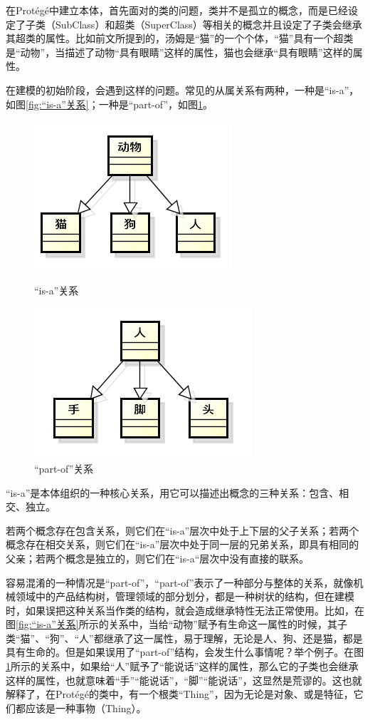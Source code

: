 \documentclass[12pt,a4paper]{article}
\begin{document}
	在Prot{\'e}g{\'e}中建立本体，首先面对的类的问题，类并不是孤立的概念，而是已经设定了子类（SubClass）和超类（SuperClass）等相关的概念并且设定了子类会继承其超类的属性。比如前文所提到的，汤姆是“猫”的一个个体，“猫”具有一个超类是“动物”，当描述了动物“具有眼睛”这样的属性，猫也会继承“具有眼睛”这样的属性。
	
	在建模的初始阶段，会遇到这样的问题。常见的从属关系有两种，一种是“is-a”，如图\ref{fig:“is-a”关系}；一种是“part-of”，如图\ref{fig:“part-of”关系}。
	\begin{figure}[htbp]
	\begin{minipage}[t]{0.5\linewidth}
	\centering
	\includegraphics[scale=1]{fig/isA.png}
	\caption{“is-a”关系}
	\label{fig:“is-a”关系}
	\end{minipage}
	\begin{minipage}[t]{0.5\linewidth}
	\centering
	\includegraphics[scale=1]{fig/partOf.png}
	\caption{“part-of”关系}
	\label{fig:“part-of”关系}
	\end{minipage}
	\end{figure}
	
	“is-a”是本体组织的一种核心关系，用它可以描述出概念的三种关系：包含、相交、独立。
	
	若两个概念存在包含关系，则它们在“is-a”层次中处于上下层的父子关系；若两个概念存在相交关系，则它们在“is-a”层次中处于同一层的兄弟关系，即具有相同的父亲；若两个概念是独立的，则它们在“is-a“层次中没有直接的联系。
	
	容易混淆的一种情况是“part-of”，“part-of”表示了一种部分与整体的关系，就像机械领域中的产品结构树，管理领域的部分划分，都是一种树状的结构，但在建模时，如果误把这种关系当作类的结构，就会造成继承特性无法正常使用。比如，在图\ref{fig:“is-a”关系}所示的关系中，当给“动物”赋予有生命这一属性的时候，其子类“猫”、“狗”、“人”都继承了这一属性，易于理解，无论是人、狗、还是猫，都是具有生命的。但是如果误用了“part-of”结构，会发生什么事情呢？举个例子。在图\ref{fig:“part-of”关系}所示的关系中，如果给“人”赋予了“能说话”这样的属性，那么它的子类也会继承这样的属性，也就意味着“手”“能说话”，“脚”“能说话”，这显然是荒谬的。这也就解释了，在Prot{\'e}g{\'e}的类中，有一个根类“Thing”，因为无论是对象、或是特征，它们都应该是一种事物（Thing）。
	
\end{document}
